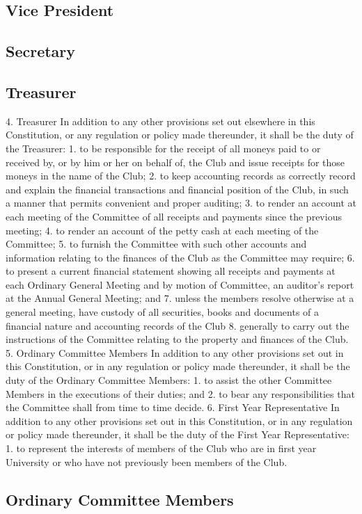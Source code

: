 \documentclass[12pt]{article} %
\begin{document}
\subsection{Vice President}
\subsection{Secretary}
\subsection{Treasurer}
4. Treasurer
In addition to any other provisions set out elsewhere in this Constitution, or any
regulation or policy made thereunder, it shall be the duty of the Treasurer:
1. to be responsible for the receipt of all moneys paid to or received by, or by
him or her on behalf of, the Club and issue receipts for those moneys in the
name of the Club;
2. to keep accounting records as correctly record and explain the financial
transactions and financial position of the Club, in such a manner that permits
convenient and proper auditing;
3. to render an account at each meeting of the Committee of all receipts and
payments since the previous meeting;
4. to render an account of the petty cash at each meeting of the Committee;
5. to furnish the Committee with such other accounts and information relating to
the finances of the Club as the Committee may require;
6. to present a current financial statement showing all receipts and payments at
each Ordinary General Meeting and by motion of Committee, an auditor's
report at the Annual General Meeting; and
7. unless the members resolve otherwise at a general meeting, have custody of
all securities, books and documents of a financial nature and accounting
records of the Club
8. generally to carry out the instructions of the Committee relating to the
property and finances of the Club.
5. Ordinary Committee Members
In addition to any other provisions set out in this Constitution, or in any regulation or
policy made thereunder, it shall be the duty of the Ordinary Committee Members:
1. to assist the other Committee Members in the executions of their duties; and
2. to bear any responsibilities that the Committee shall from time to time decide.
6. First Year Representative
In addition to any other provisions set out in this Constitution, or in any regulation or
policy made thereunder, it shall be the duty of the First Year Representative:
1. to represent the interests of members of the Club who are in first year
University or who have not previously been members of the Club.
\subsection{Ordinary Committee Members}
\end{document}

